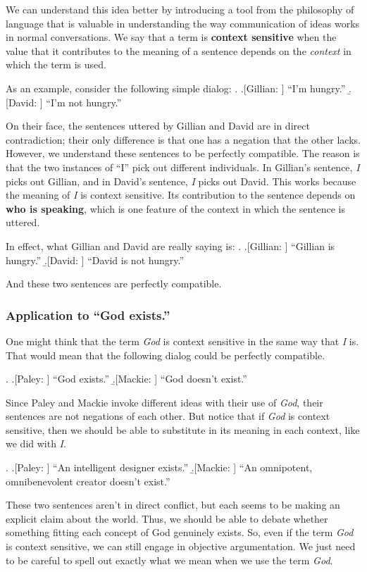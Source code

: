 \documentclass[letterpaper,10pt]{article}
\begin{document}
We can understand this idea better by introducing a tool from the philosophy of language that is valuable in understanding the way communication of ideas works in normal conversations.  We say that a term is \textbf{context sensitive} when the value that it contributes to the meaning of a sentence depends on the \textit{context} in which the term is used. 

As an example, consider the following simple dialog:
\ex. \a.[Gillian: ] ``I'm hungry.''
\b.[David: ] ``I'm not hungry.''

On their face, the sentences uttered by Gillian and David are in direct contradiction; their only difference is that one has a negation that the other lacks. However, we understand these sentences to be perfectly compatible.  The reason is that the two instances of ``I'' pick out different individuals. In Gillian's sentence, \textit{I} picks out Gillian, and in David's sentence, \textit{I} picks out David. This works because the meaning of \textit{I} is context sensitive.  Its contribution to the sentence depends on \textbf{who is speaking}, which is one feature of the context in which the sentence is uttered.

In effect, what Gillian and David are really saying is:
\ex. \a.[Gillian: ] ``Gillian is hungry.''
\b.[David: ] ``David is not hungry.''

And these two sentences are perfectly compatible.

\subsubsection{Application to ``God exists.''}
One might think that the term \textit{God} is context sensitive in the same way that \textit{I} is.  That would mean that the following dialog could be perfectly compatible.

\ex. \a.[Paley: ] ``God exists.''
\b.[Mackie: ] ``God doesn't exist.''

Since Paley and Mackie invoke different ideas with their use of \textit{God}, their sentences are not negations of each other.  But notice that if \textit{God} is context sensitive, then we should be able to substitute in its meaning in each context, like we did with \textit{I}.

\ex. \a.[Paley: ] ``An intelligent designer exists.''
\b.[Mackie: ] ``An omnipotent, omnibenevolent creator doesn't exist.''

These two sentences aren't in direct conflict, but each seems to be making an explicit claim about the world.  Thus, we should be able to debate whether something fitting each concept of God genuinely exists.  So, even if the term \textit{God} is context sensitive, we can still engage in objective argumentation.  We just need to be careful to spell out exactly what we mean when we use the term \textit{God}.
\end{document}
